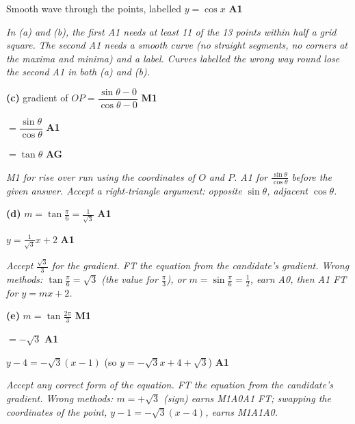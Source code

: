 \documentclass[12pt, twoside]{article}
\begin{document}
\begin{enumerate}[itemsep=0.3cm]
Smooth wave through the points, labelled $y = \cos x$ \hfill \textbf{A1}

\emph{In (a) and (b), the first A1 needs at least 11 of the 13 points
within half a grid square. The second A1 needs a smooth curve (no straight
segments, no corners at the maxima and minima) and a label. Curves
labelled the wrong way round lose the second A1 in both (a) and (b).}

\textbf{(c)} gradient of $OP = \dfrac{\sin\theta - 0}{\cos\theta - 0}$
\hfill \textbf{M1}

$= \dfrac{\sin\theta}{\cos\theta}$ \hfill \textbf{A1}

$= \tan\theta$ \hfill \textbf{AG}

\emph{M1 for rise over run using the coordinates of $O$ and $P$. A1 for
$\frac{\sin\theta}{\cos\theta}$ before the given answer. Accept a
right-triangle argument: opposite $\sin\theta$, adjacent $\cos\theta$.}

\textbf{(d)} $m = \tan\frac{\pi}{6} = \frac{1}{\sqrt{3}}$ \hfill \textbf{A1}

$y = \frac{1}{\sqrt{3}}x + 2$ \hfill \textbf{A1}

\emph{Accept $\frac{\sqrt{3}}{3}$ for the gradient. FT the equation from
the candidate's gradient. Wrong methods: $\tan\frac{\pi}{6} = \sqrt{3}$
(the value for $\frac{\pi}{3}$), or $m = \sin\frac{\pi}{6} = \frac{1}{2}$,
earn A0, then A1 FT for $y = mx + 2$.}

\textbf{(e)} $m = \tan\frac{2\pi}{3}$ \hfill \textbf{M1}

$= -\sqrt{3}$ \hfill \textbf{A1}

$y - 4 = -\sqrt{3}(x - 1)$ \quad (so $y = -\sqrt{3}x + 4 + \sqrt{3}$)
\hfill \textbf{A1}

\emph{Accept any correct form of the equation. FT the equation from the
candidate's gradient. Wrong methods: $m = +\sqrt{3}$ (sign) earns
M1A0A1 FT; swapping the coordinates of the point,
$y - 1 = -\sqrt{3}(x - 4)$, earns M1A1A0.}

\end{enumerate}
\end{document}
